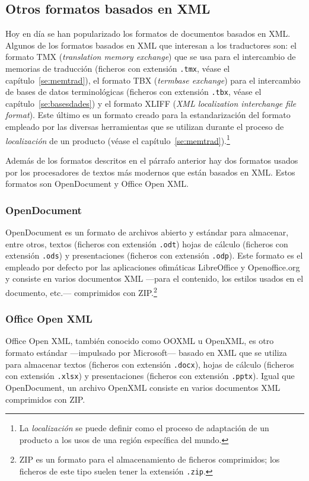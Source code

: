 \subsection{Otros formatos basados en XML} Hoy en día se han popularizado los formatos de documentos basados en XML. Algunos de los formatos basados en XML que interesan a los traductores son: el formato TMX (\emph{translation memory exchange}) que se usa para el intercambio de memorias de traducción (ficheros con extensión \texttt{.tmx}, véase el capítulo~\ref{se:memtrad}), el formato TBX (\emph{termbase exchange}) para el intercambio de bases de datos terminológicas (ficheros con extensión \texttt{.tbx}, véase el capítulo~\ref{se:basesdades}) y el formato XLIFF (\emph{XML localization interchange file format}). Este último es un formato creado para la estandarización del formato empleado por las diversas herramientas que se utilizan durante el proceso de \emph{localización} de un producto (véase el capítulo~\ref{se:memtrad}).\footnote{La \emph{localización} se puede definir como el proceso de adaptación de un producto a los usos de una región específica del mundo.} 

Además de los formatos descritos en el párrafo anterior hay dos formatos usados por los procesadores de textos más modernos que están basados en XML. Estos formatos son OpenDocument y Office Open XML. 

\subsubsection{OpenDocument} OpenDocument es un formato de archivos abierto y estándar para almacenar, entre otros, textos (ficheros con extensión \texttt{.odt}) hojas de cálculo (ficheros con extensión \texttt{.ods}) y presentaciones (ficheros con extensión \texttt{.odp}). Este formato es el empleado por defecto por las aplicaciones ofimáticas LibreOffice y Openoffice.org y consiste en varios documentos XML ---para el contenido, los estilos usados en el documento, etc.--- comprimidos con ZIP.\footnote{ZIP es un formato para el almacenamiento de ficheros comprimidos; los ficheros de este tipo suelen tener la extensión \texttt{.zip}.} 

\subsubsection{Office Open XML} Office Open XML, también conocido como OOXML u OpenXML, es otro formato estándar ---impulsado por Microsoft--- basado en XML que se utiliza para almacenar textos (ficheros con extensión \texttt{.docx}), hojas de cálculo (ficheros con extensión \texttt{.xlsx}) y presentaciones (ficheros con extensión \texttt{.pptx}). Igual que OpenDocument, un archivo OpenXML consiste en varios documentos XML comprimidos con ZIP. 

